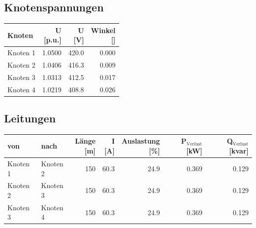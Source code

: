 \documentclass[11pt,a4paper]{article}
\begin{document}
\subsection{Knotenspannungen}

\begin{table}[H]
\centering
\begin{adjustbox}{max width=\linewidth}
\begin{tabular}{lrrr}
\toprule
\textbf{Knoten} & \thead{U \\ {[p.u.]}} & \thead{U \\ {[V]}} & \thead{Winkel \\ {[\textdegree{}]}} \\
\midrule
Knoten 1 & 1.0500 & 420.0 & 0.000 \\
Knoten 2 & 1.0406 & 416.3 & 0.009 \\
Knoten 3 & 1.0313 & 412.5 & 0.017 \\
Knoten 4 & 1.0219 & 408.8 & 0.026 \\
\bottomrule
\end{tabular}
\end{adjustbox}
\end{table}

\subsection{Leitungen}

\begin{table}[H]
\centering
\begin{adjustbox}{max width=\linewidth}
\begin{tabular}{llrrrrr}
\toprule
\textbf{von} & \textbf{nach} & \thead{Länge \\ {[m]}} & \thead{I \\ {[A]}} & \thead{Auslastung \\ {[\%]}} & \thead{P$_\mathrm{Verlust}$ \\ {[kW]}} & \thead{Q$_\mathrm{Verlust}$ \\ {[kvar]}} \\
\midrule
Knoten 1 & Knoten 2 & 150 & 60.3 & 24.9 & 0.369 & 0.129 \\
Knoten 2 & Knoten 3 & 150 & 60.3 & 24.9 & 0.369 & 0.129 \\
Knoten 3 & Knoten 4 & 150 & 60.3 & 24.9 & 0.369 & 0.129 \\
\bottomrule
\end{tabular}
\end{adjustbox}
\end{table}
\end{document}
